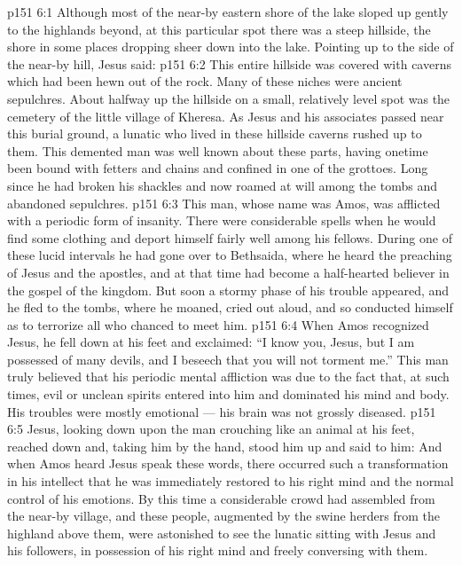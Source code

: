 \vs p151 6:1 Although most of the near\hyp{}by eastern shore of the lake sloped up gently to the highlands beyond, at this particular spot there was a steep hillside, the shore in some places dropping sheer down into the lake. Pointing up to the side of the near\hyp{}by hill, Jesus said: 
\vs p151 6:2 This entire hillside was covered with caverns which had been hewn out of the rock. Many of these niches were ancient sepulchres. About halfway up the hillside on a small, relatively level spot was the cemetery of the little village of Kheresa. As Jesus and his associates passed near this burial ground, a lunatic who lived in these hillside caverns rushed up to them. This demented man was well known about these parts, having onetime been bound with fetters and chains and confined in one of the grottoes. Long since he had broken his shackles and now roamed at will among the tombs and abandoned sepulchres.
\vs p151 6:3 This man, whose name was Amos, was afflicted with a periodic form of insanity. There were considerable spells when he would find some clothing and deport himself fairly well among his fellows. During one of these lucid intervals he had gone over to Bethsaida, where he heard the preaching of Jesus and the apostles, and at that time had become a half\hyp{}hearted believer in the gospel of the kingdom. But soon a stormy phase of his trouble appeared, and he fled to the tombs, where he moaned, cried out aloud, and so conducted himself as to terrorize all who chanced to meet him.
\vs p151 6:4 When Amos recognized Jesus, he fell down at his feet and exclaimed: “I know you, Jesus, but I am possessed of many devils, and I beseech that you will not torment me.” This man truly believed that his periodic mental affliction was due to the fact that, at such times, evil or unclean spirits entered into him and dominated his mind and body. His troubles were mostly emotional --- his brain was not grossly diseased.
\vs p151 6:5 Jesus, looking down upon the man crouching like an animal at his feet, reached down and, taking him by the hand, stood him up and said to him:  And when Amos heard Jesus speak these words, there occurred such a transformation in his intellect that he was immediately restored to his right mind and the normal control of his emotions. By this time a considerable crowd had assembled from the near\hyp{}by village, and these people, augmented by the swine herders from the highland above them, were astonished to see the lunatic sitting with Jesus and his followers, in possession of his right mind and freely conversing with them.
